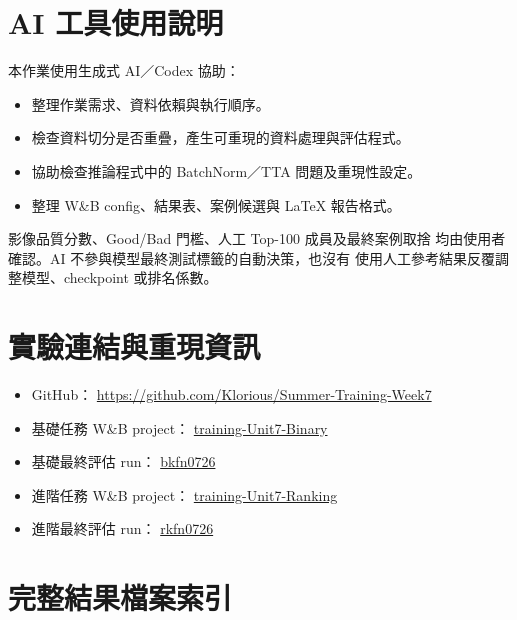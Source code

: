 \documentclass[12pt,a4paper,fontset=none]{ctexart}
\begin{document}
\section{AI 工具使用說明}
\label{sec:ai-tools}

本作業使用生成式 AI／Codex 協助：
\begin{itemize}
  \item 整理作業需求、資料依賴與執行順序。
  \item 檢查資料切分是否重疊，產生可重現的資料處理與評估程式。
  \item 協助檢查推論程式中的 BatchNorm／TTA 問題及重現性設定。
  \item 整理 W\&B config、結果表、案例候選與 LaTeX 報告格式。
\end{itemize}

影像品質分數、Good/Bad 門檻、人工 Top-100 成員及最終案例取捨
均由使用者確認。AI 不參與模型最終測試標籤的自動決策，也沒有
使用人工參考結果反覆調整模型、checkpoint 或排名係數。

\section{實驗連結與重現資訊}
\label{sec:links}

\begin{itemize}
  \item GitHub：
  \href{https://github.com/Klorious/Summer-Training-Week7}
  {https://github.com/Klorious/Summer-Training-Week7}
  \item 基礎任務 W\&B project：
  \href{https://wandb.ai/klorius-/training-Unit7-Binary}
  {training-Unit7-Binary}
  \item 基礎最終評估 run：
  \href{https://wandb.ai/klorius-/training-Unit7-Binary/runs/bkfn0726}
  {bkfn0726}
  \item 進階任務 W\&B project：
  \href{https://wandb.ai/klorius-/training-Unit7-Ranking}
  {training-Unit7-Ranking}
  \item 進階最終評估 run：
  \href{https://wandb.ai/klorius-/training-Unit7-Ranking/runs/rkfn0726}
  {rkfn0726}
\end{itemize}

\appendix
\section{完整結果檔案索引}
\label{app:result-files}
\end{document}

